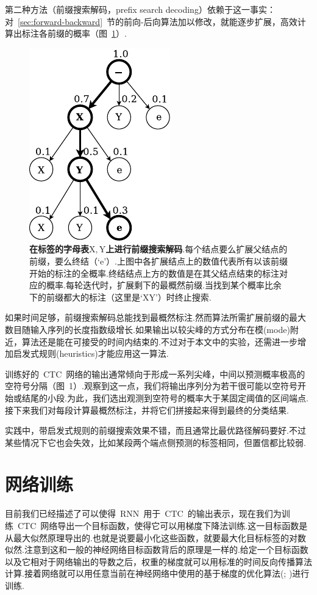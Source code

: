 \documentclass{ctexart}
\begin{document}
第二种方法（前缀搜索解码，prefix search decoding）依赖于这一事实：对~\ref{sec:forward-backward}~节的前向-后向算法加以修改，就能逐步扩展，高效计算出标注各前缀的概率（图~\ref{fig:2}）.
\begin{figure}
	\label{fig:2}
	\centering
	\includegraphics[width=0.5\columnwidth]{fig/2}
	\caption{\textbf{在标签的字母表$\mathrm{X}, \mathrm{Y}$上进行前缀搜索解码}.每个结点要么扩展父结点的前缀，要么终结（`$\mathrm{e}$'）.上图中各扩展结点上的数值代表所有以该前缀开始的标注的全概率.终结结点上方的数值是在其父结点结束的标注对应的概率.每轮迭代时，扩展剩下的最概然前缀.当找到某个概率比余下的前缀都大的标注（这里是`$\mathrm{XY}$'）时终止搜索.}
\end{figure}

如果时间足够，前缀搜索解码总能找到最概然标注.然而算法所需扩展前缀的最大数目随输入序列的长度指数级增长.如果输出以较尖峰的方式分布在模(mode)附近，算法还是能在可接受的时间内结束的.不过对于本文中的实验，还需进一步增加启发式规则(heuristics)才能应用这一算法.

训练好的~CTC~网络的输出通常倾向于形成一系列尖峰，中间以预测概率极高的空符号分隔（图~1）.观察到这一点，我们将输出序列分为若干很可能以空符号开始或结尾的小段.为此，我们选出观测到空符号的概率大于某固定阈值的区间端点.接下来我们对每段计算最概然标注，并将它们拼接起来得到最终的分类结果.

实践中，带启发式规则的前缀搜索效果不错，而且通常比最优路径解码要好.不过某些情况下它也会失效，比如某段两个端点侧预测的标签相同，但置信都比较弱.
\section{网络训练}
\label{sec:training}
目前我们已经描述了可以使得~RNN~用于~CTC~的输出表示，现在我们为训练~CTC~网络导出一个目标函数，使得它可以用梯度下降法训练.这一目标函数是从最大似然原理导出的.也就是说要最小化这些函数，就要最大化目标标签的对数似然.注意到这和一般的神经网络目标函数\citep{bishop1995neural}背后的原理是一样的.给定一个目标函数以及它相对于网络输出的导数之后，权重的梯度就可以用标准的时间反向传播算法计算.接着网络就可以用任意当前在神经网络中使用的基于梯度的优化算法(\citealp{lecun1998efficient}; \citealp{schraudolph2002fast})进行训练.
\end{document}
